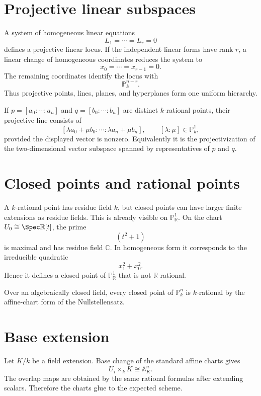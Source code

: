 \section{Projective linear subspaces}
A system of homogeneous linear equations
\[
L_1=\cdots=L_r=0
\]
defines a projective linear locus.  If the independent linear forms have rank \(r\), a linear change of homogeneous coordinates reduces the system to
\[
x_0=\cdots=x_{r-1}=0.
\]
The remaining coordinates identify the locus with
\[
\mathbb P^{n-r}_k.
\]
Thus projective points, lines, planes, and hyperplanes form one uniform hierarchy.

\begin{proposition}
If \(p=[a_0:\cdots:a_n]\) and \(q=[b_0:\cdots:b_n]\) are distinct \(k\)-rational points, their projective line consists of
\[
[\lambda a_0+\mu b_0:\cdots:\lambda a_n+\mu b_n],
\qquad [\lambda:\mu]\in\mathbb P^1_k,
\]
provided the displayed vector is nonzero.  Equivalently it is the projectivization of the two-dimensional vector subspace spanned by representatives of \(p\) and \(q\).
\end{proposition}



\section{Closed points and rational points}
A \(k\)-rational point has residue field \(k\), but closed points can have larger finite extensions as residue fields.  This is already visible on \(\mathbb P^1_{\mathbb R}\).  On the chart \(U_0\cong\Spec\mathbb R[t]\), the prime
\[
(t^2+1)
\]
is maximal and has residue field \(\mathbb C\).  In homogeneous form it corresponds to the irreducible quadratic
\[
x_1^2+x_0^2.
\]
Hence it defines a closed point of \(\mathbb P^1_{\mathbb R}\) that is not \(\mathbb R\)-rational.

Over an algebraically closed field, every closed point of \(\mathbb P^n_k\) is \(k\)-rational by the affine-chart form of the Nullstellensatz.

\section{Base extension}
Let \(K/k\) be a field extension.  Base change of the standard affine charts gives
\[
U_i\times_k K\cong\mathbb A^n_K.
\]
The overlap maps are obtained by the same rational formulas after extending scalars.  Therefore the charts glue to the expected scheme.

